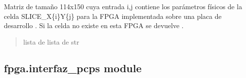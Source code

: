 \documentclass[letterpaper,10pt,english]{sphinxmanual}
\begin{document}
\begin{fulllineitems}
\label{\detokenize{fpga.fabric:fpga.fabric.pynqz2}}
\pysigstartsignatures
{}
\pysigstopsignatures
\sphinxAtStartPar
Matriz de tamaño 114x150 cuya entrada i,j contiene los parámetros físicos de la celda SLICE\_X\{i\}Y\{j\} para la FPGA implementada sobre una placa de desarrollo . Si la celda no existe en esta FPGA se devuelve .
\begin{quote}\begin{description}
\sphinxAtStartPar
lista de lista de str

\end{description}\end{quote}

\end{fulllineitems}


\sphinxstepscope


\subsection{fpga.interfaz\_pcps module}
\label{\detokenize{fpga.interfaz_pcps:module-fpga.interfaz_pcps}}\label{\detokenize{fpga.interfaz_pcps:fpga-interfaz-pcps-module}}\label{\detokenize{fpga.interfaz_pcps::doc}}
\end{document}
